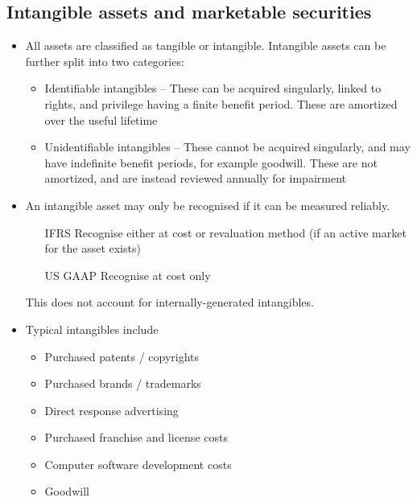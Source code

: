 \documentclass[../notes_compiled.tex]{subfiles}
\begin{document}
\subsection{Intangible assets and marketable securities}
\label{intangibles}
\begin{itemize}
\item All assets are classified as tangible or intangible. Intangible assets can be further split into two categories:
\begin{itemize}
\item Identifiable intangibles -- These can be acquired singularly, linked to rights, and privilege having a finite benefit period. These are amortized over the useful lifetime
\item Unidentifiable intangibles -- These cannot be acquired singularly, and may have indefinite benefit periods, for example goodwill. These are not amortized, and are instead reviewed annually for impairment
\end{itemize}

\item An intangible asset may only be recognised if it can be measured reliably.
\begin{itemize}
\item[IFRS] Recognise either at cost or revaluation method (if an active market for the asset exists)
\item[US GAAP] Recognise at cost only
\end{itemize}
This does not account for internally-generated intangibles.

\item Typical intangibles include
\begin{multicols}{2}
\begin{itemize}
\item Purchased patents / copyrights
\item Purchased brands / trademarks
\item Direct response advertising
\item Purchased franchise and license costs
\item Computer software development costs
\item Goodwill

\end{itemize}
\end{multicols}


\end{itemize}
\end{document}
